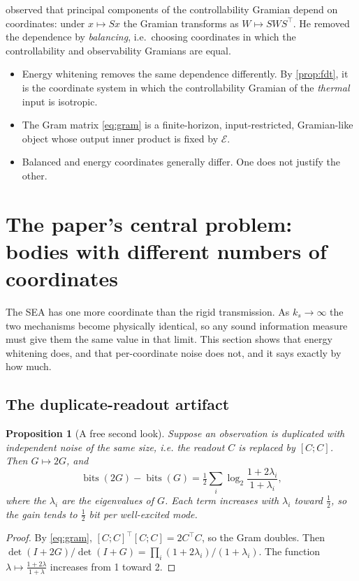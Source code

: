 \documentclass[11pt]{article}
\newtheorem{proposition}[theorem]{Proposition}
\theoremstyle{definition}
\theoremstyle{remark}
\newcommand{\bits}{\operatorname{bits}}
\newcommand{\Em}{\mathcal{E}}         %
\begin{document}
\begin{itemize}
        \citeauthor{moore1981principal} observed that principal components of the
        controllability Gramian depend on coordinates: under $x\mapsto Sx$ the Gramian
        transforms as $W\mapsto SWS^\top$. He removed the dependence by
        \emph{balancing}, i.e.\ choosing coordinates in which the controllability and
        observability Gramians are equal.
        \begin{itemize}[nosep]
          \item Energy whitening removes the same dependence differently. By
                \cref{prop:fdt}, it is the coordinate system in which the
                controllability Gramian of the \emph{thermal} input is isotropic.
          \item The Gram matrix \eqref{eq:gram} is a finite-horizon, input-restricted,
                Gramian-like object whose output inner product is fixed by $\Em$.
          \item Balanced and energy coordinates generally differ. One does not justify
                the other.
        \end{itemize}
\end{itemize}

\section{The paper's central problem: bodies with different numbers of coordinates}
\label{sec:dof}

The SEA has one more coordinate than the rigid transmission. As $k_s\to\infty$ the two
mechanisms become physically identical, so any sound information measure must give them
the same value in that limit. This section shows that energy whitening does, and that
per-coordinate noise does not, and it says exactly by how much.

\subsection{The duplicate-readout artifact}

\begin{proposition}[A free second look]\label{prop:dup}
Suppose an observation is duplicated with \emph{independent} noise of the same size, i.e.
the readout $C$ is replaced by $[C;C]$. Then $G\mapsto2G$, and
\[
  \bits(2G)-\bits(G)=\tfrac12\sum_{i}\log_2\frac{1+2\lambda_i}{1+\lambda_i},
\]
where the $\lambda_i$ are the eigenvalues of $G$. Each term increases with $\lambda_i$
toward $\frac12$, so the gain tends to $\frac12$ bit per well-excited mode.
\end{proposition}
\begin{proof}
By \eqref{eq:gram}, $[C;C]^\top[C;C]=2C^\top C$, so the Gram doubles. Then
$\det(I+2G)/\det(I+G)=\prod_i(1+2\lambda_i)/(1+\lambda_i)$. The function
$\lambda\mapsto\frac{1+2\lambda}{1+\lambda}$ increases from 1 toward 2.
\end{proof}
\end{document}
